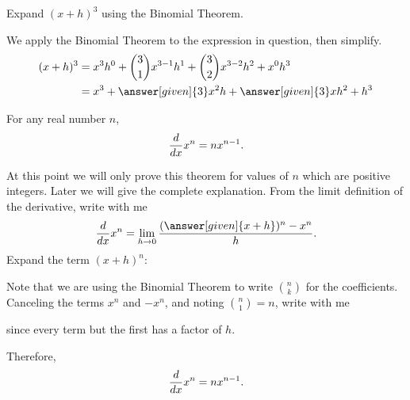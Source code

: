 \documentclass{ximera}
\begin{document}
\begin{example}
Expand $(x+h)^3$ using the Binomial Theorem.
\begin{explanation}
We apply the Binomial Theorem to the expression in question, then simplify.
\begin{align*}
(x+h)^3 &= x^3h^0 + \binom{3}{1} x^{3-1}h^1 + \binom{3}{2} x^{3-2}h^2 + x^{0}h^3\\
	& = x^3 + \answer[given]{3} x^2 h + \answer[given]{3} xh^2 + h^3
\end{align*}
\end{explanation}
\end{example}

\begin{theorem}\label{T:powerrule}
For any real number $n$, 
\[
\frac{d}{\mathop{}\!d x} x^n = n x^{n-1}.
\]

\begin{explanation}
At this point we will only prove this theorem for values of $n$ which
are positive integers. Later we will give the complete explanation.
From the limit definition of the derivative, write with me
\[
\ddx x^n = \lim_{ h\to0} \frac{(\answer[given]{x+ h})^n-x^n}{h}.
\]
Expand the term $(x+h)^n$:
\begin{image}
\end{image}
Note that we are using the Binomial Theorem to write $\binom{n}{k}$
for the coefficients. Canceling the terms $x^n$ and $-x^n$, and noting
$\binom{n}{1}= n$, write with me
\begin{image}
\end{image}

since every term but the first has a factor of $h$.

Therefore,
\[
\frac{d}{\mathop{}\!d x} x^n = nx^{n-1}.
\]
\end{explanation}
\end{theorem}
\end{document}
